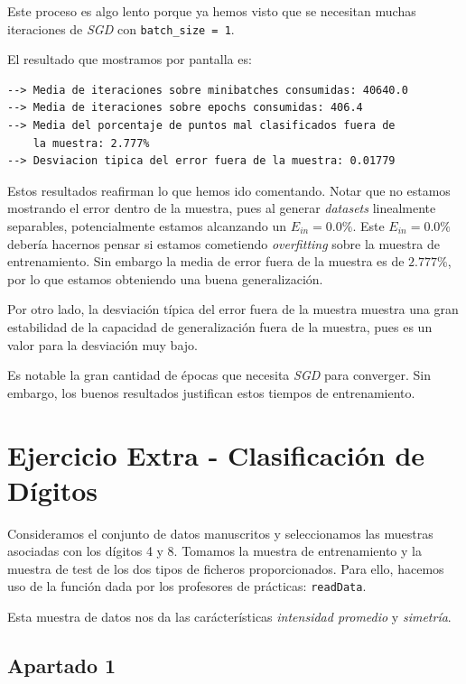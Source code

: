 \documentclass[11pt]{article}
\begin{document}
Este proceso es algo lento porque ya hemos visto que se necesitan muchas iteraciones de \emph{SGD} con \lstinline{batch_size = 1}.

El resultado que mostramos por pantalla es:

\begin{lstlisting}[caption={Resultado de las 100 iteraciones del experimento}, captionpos=b]
--> Media de iteraciones sobre minibatches consumidas: 40640.0
--> Media de iteraciones sobre epochs consumidas: 406.4
--> Media del porcentaje de puntos mal clasificados fuera de
    la muestra: 2.777%
--> Desviacion tipica del error fuera de la muestra: 0.01779
\end{lstlisting}

Estos resultados reafirman lo que hemos ido comentando. Notar que no estamos mostrando el error dentro de la muestra, pues al generar \emph{datasets} linealmente separables, potencialmente estamos alcanzando un $E_{in} = 0.0\%$. Este $E_{in} = 0.0\%$ debería hacernos pensar si estamos cometiendo \emph{overfitting} sobre la muestra de entrenamiento. Sin embargo la media de error fuera de la muestra es de $2.777\%$, por lo que estamos obteniendo una buena generalización.

Por otro lado, la desviación típica del error fuera de la muestra muestra una gran estabilidad de la capacidad de generalización fuera de la muestra, pues es un valor para la desviación muy bajo.

Es notable la gran cantidad de épocas que necesita \emph{SGD} para converger. Sin embargo, los buenos resultados justifican estos tiempos de entrenamiento.

\pagebreak

\section{Ejercicio Extra - Clasificación de Dígitos}

Consideramos el conjunto de datos manuscritos y seleccionamos las muestras asociadas con los dígitos 4 y 8. Tomamos la muestra de entrenamiento y la muestra de test de los dos tipos de ficheros proporcionados. Para ello, hacemos uso de la función dada por los profesores de prácticas: \lstinline{readData}.

Esta muestra de datos nos da las carácterísticas \emph{intensidad promedio} y \emph{simetría}.

\subsection{Apartado 1}
\end{document}
